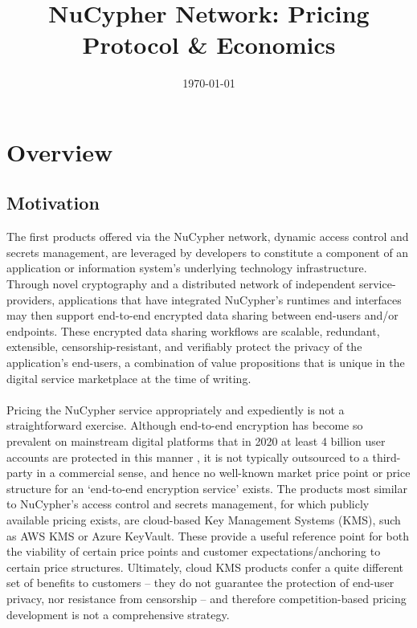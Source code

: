 \documentclass[longbibliography,nofootinbib]{revtex4-1}
\begin{document}
\title{NuCypher Network: Pricing Protocol \& Economics}


\date{\today}
\maketitle

\section{Overview}
\subsection{Motivation}

The first products offered via the NuCypher network, dynamic access control and secrets management, are leveraged by developers to constitute a component of an application or information system’s underlying technology infrastructure. Through novel cryptography and a distributed network of independent service-providers, applications that have integrated NuCypher’s runtimes and interfaces may then support end-to-end encrypted data sharing between end-users and/or endpoints. These encrypted data sharing workflows are scalable, redundant, extensible, censorship-resistant, and verifiably protect the privacy of the application's end-users, a combination of value propositions that is unique in the digital service marketplace at the time of writing.
\\\\
Pricing the NuCypher service appropriately and expediently is not a straightforward exercise. Although end-to-end encryption has become so prevalent on mainstream digital platforms that in 2020 at least 4 billion user accounts are protected in this manner \cite{statista1}\cite{statista2}\cite{statista3}\cite{statista4}, it is not typically outsourced to a third-party in a commercial sense, and hence no well-known market price point or price structure for an ‘end-to-end encryption service’ exists. The products most similar to NuCypher’s access control and secrets management, for which publicly available pricing exists, are cloud-based Key Management Systems (KMS), such as AWS KMS or Azure KeyVault. These provide a useful reference point for both the viability of certain price points and customer expectations/anchoring to certain price structures. Ultimately, cloud KMS products confer a quite different set of benefits to customers – they do not guarantee the protection of end-user privacy, nor resistance from censorship – and therefore competition-based pricing development is not a comprehensive strategy.
\end{document}
